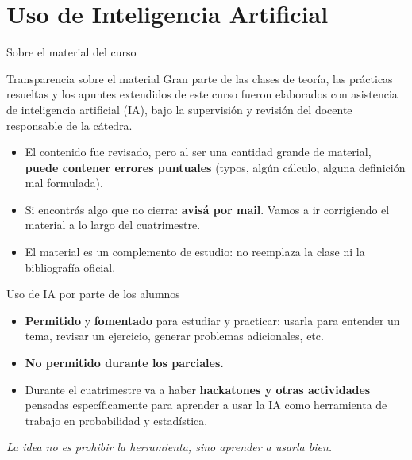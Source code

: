 \documentclass[aspectratio=169,11pt]{beamer}
\begin{document}
\section{Uso de Inteligencia Artificial}

\begin{frame}{Sobre el material del curso}
\begin{alertblock}{Transparencia sobre el material}
Gran parte de las clases de teoría, las prácticas resueltas y los apuntes extendidos de este curso fueron elaborados con asistencia de inteligencia artificial (IA), bajo la supervisión y revisión del docente responsable de la cátedra.
\end{alertblock}

\begin{itemize}\small
\item El contenido fue revisado, pero al ser una cantidad grande de material, \textbf{puede contener errores puntuales} (typos, algún cálculo, alguna definición mal formulada).
\item Si encontrás algo que no cierra: \textbf{avisá por mail}. Vamos a ir corrigiendo el material a lo largo del cuatrimestre.
\item El material es un complemento de estudio: no reemplaza la clase ni la bibliografía oficial.
\end{itemize}
\end{frame}

\begin{frame}{Uso de IA por parte de los alumnos}
\begin{itemize}
\item \textbf{Permitido} y \textbf{fomentado} para estudiar y practicar: usarla para entender un tema, revisar un ejercicio, generar problemas adicionales, etc.
\item \textbf{No permitido durante los parciales.}
\item Durante el cuatrimestre va a haber \textbf{hackatones y otras actividades} pensadas específicamente para aprender a usar la IA como herramienta de trabajo en probabilidad y estadística.
\end{itemize}

\vspace{0.8em}
\centering
\emph{La idea no es prohibir la herramienta, sino aprender a usarla bien.}
\end{frame}

\end{document}
